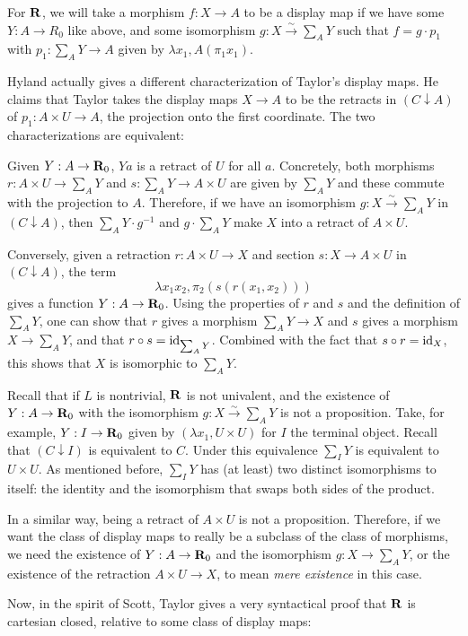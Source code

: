 \begin{definition}
  For $ \mathbf{R} $, we will take a morphism $ f: X \to A $ to be a display map if we have some $ Y : A \to R_0 $ like above, and some isomorphism $ g: X \xrightarrow{\sim} \sum_A Y $ such that $ f = g \cdot p_1 $ with $ p_1 : \sum_A Y \to A $ given by $ \lambda x_1, A (\pi_1 x_1) $.
\end{definition}

\begin{remark}
  Hyland actually gives a different characterization of Taylor's display maps. He claims that Taylor takes the display maps $ X \to A $ to be the retracts in $ (C \downarrow A) $ of $ p_1: A \times U \to A $,
  the projection onto the first coordinate. The two characterizations are equivalent:

  Given $ Y: A \to \mathbf{R}_0 $, $ Y a $ is a retract of $ U $ for all $ a $. Concretely, both morphisms $ r : A \times U \to \sum_A Y $ and $ s : \sum_A Y \to A \times U $ are given by $ \sum_A Y $ and these commute with the projection to $ A $. Therefore, if we have an isomorphism $ g: X \xrightarrow{\sim} \sum_A Y $ in $ (C \downarrow A) $, then $ \sum_A Y \cdot g^{-1} $ and $ g \cdot \sum_A Y $ make $ X $ into a retract of $ A \times U $.

  Conversely, given a retraction $ r : A \times U \to X $ and section $ s : X \to A \times U $ in $ (C \downarrow A) $, the term
  \[ \lambda x_1 x_2, \pi_2 (s (r (x_1, x_2))) \]
  gives a function $ Y : A \to \mathbf{R}_0 $. Using the properties of $ r $ and $ s $ and the definition of $ \sum_A Y $, one can show that $ r $ gives a morphism $ \sum_A Y \to X $ and $ s $ gives a morphism $ X \to \sum_A Y $, and that $ r \circ s = \text{id}_{\sum_A Y} $. Combined with the fact that $ s \circ r = \text{id}_{X} $, this shows that $ X $ is isomorphic to $ \sum_A Y $.
\end{remark}

\begin{remark}
  Recall that if $ L $ is nontrivial, $ \mathbf{R} $ is not univalent, and the existence of $ Y: A \to \mathbf{R}_0 $ with the isomorphism $ g: X \xrightarrow{\sim} \sum_A Y $ is not a proposition. Take, for example, $ Y : I \to \mathbf{R}_0 $ given by $ (\lambda x_1, U \times U) $ for $ I $ the terminal object. Recall that $ (C \downarrow I) $ is equivalent to $ C $. Under this equivalence $ \sum_I Y $ is equivalent to $ U \times U $. As mentioned before, $ \sum_I Y $ has (at least) two distinct isomorphisms to itself: the identity and the isomorphism that swaps both sides of the product.

  In a similar way, being a retract of $ A \times U $ is not a proposition. Therefore, if we want the class of display maps to really be a subclass of the class of morphisms, we need the existence of $ Y: A \to \mathbf{R}_0 $ and the isomorphism $ g : X \to \sum_A Y $, or the existence of the retraction $ A \times U \to X $, to mean \textit{mere existence} in this case.
\end{remark}

Now, in the spirit of Scott, Taylor gives a very syntactical proof that $ \mathbf{R} $ is cartesian closed, relative to some class of display maps:

\TODO
